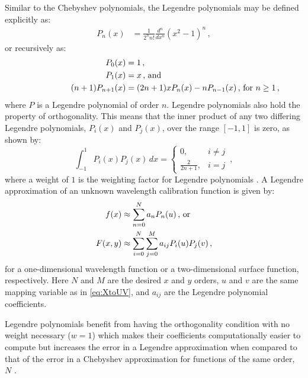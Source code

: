 Similar to the Chebyshev polynomials, the Legendre polynomials may be defined explicitly as:
\begin{align} \label{eq:legpolyexplicit}
    P_{n}(x) &= \frac{1}{2^{n} n!} \frac{d^{n}}{d x^{n}} (x^{2} - 1)^{n}\,,
\end{align}
or recursively as:
\begin{align}
    P_{0}(x) &= 1 \,,\notag\\
    P_{1}(x) &= x \rlap{\,,\ and} \label{eq:legpoly}\\
    (n+1)P_{n+1}(x) &= (2n+1)xP_n(x) - nP_{n-1}(x) \rlap{\,,\ for $n \geq 1$\,,}\notag
\end{align}
where $P$ is a Legendre polynomial of order $n$.
Legendre polynomials also hold the property of orthogonality.
This means that the inner product of any two differing Legendre polynomials, $P_{i}(x)$ and $P_{j}(x)$, over the range $[-1, 1]$ is zero, as shown by:
\begin{equation} \label{eq:legorth}
    \int_{-1}^{1} P_{i}(x) P_{j}(x) \,dx =
    \begin{cases}
        0,                 & i \neq j \\
        \frac{2}{2 n + 1}, & i = j
    \end{cases}\,,
\end{equation}
where a weight of $1$ is the weighting factor for Legendre polynomials \citep{numerical_recipes, leg}.
A Legendre approximation of an unknown wavelength calibration function is given by:
\begin{align} \label{eq:legendre}
    f(x) &\approx \sum_{n = 0}^{N} a_{n} P_{n}(u) \rlap{\,,\ or}\\
    F(x, y) &\approx \sum_{i = 0}^{N} \sum_{j = 0}^{M} a_{ij} P_{i}(u) P_{j}(v)\,,\label{eq:Legendre2D}
\end{align}
for a one-dimensional wavelength function or a two-dimensional surface function, respectively.
Here $N$ and $M$ are the desired $x$ and $y$ orders, $u$ and $v$ are the same mapping variable as in \autoref{eq:XtoUV}, and $a_{ij}$ are the Legendre polynomial coefficients.

Legendre polynomials benefit from having the orthogonality condition with no weight necessary ($w = 1$) which makes their coefficients computationally easier to compute but increases the error in a Legendre approximation when compared to that of the error in a Chebyshev approximation for functions of the same order, $N$ \citep{leg_cheb_relation}.

